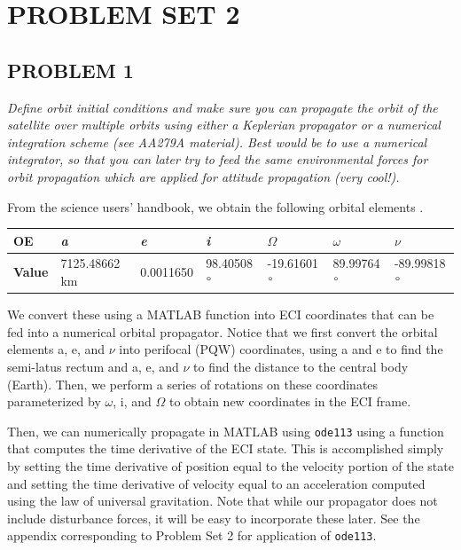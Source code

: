 \section{\Large PROBLEM SET 2}
\subsection{PROBLEM 1}
\textit{Define orbit initial conditions and make sure you can propagate the orbit of the satellite over multiple orbits using either a Keplerian propagator or a numerical integration scheme (see AA279A material). Best would be to use a numerical integrator, so that you can later try to feed the same environmental forces for orbit propagation which are applied for attitude propagation (very cool!).}

From the science users' handbook, we obtain the following orbital elements \cite{NISARHandbook}.

\begin{table}[H]
\begin{tabular}{lllllll}
\textbf{OE} & \textit{a} & \textit{e} & \textit{i} & \textit{$\Omega$} & \textit{$\omega$} & \textit{$\nu$} \\ \hline
\textbf{Value} & 7125.48662 km & 0.0011650 & 98.40508$\degree$ & -19.61601$\degree$ & 89.99764$\degree$ & -89.99818$\degree$
\end{tabular}
\end{table}

We convert these using a MATLAB function into ECI coordinates that can be fed into a numerical orbital propagator. Notice that we first convert the orbital elements a, e, and $\nu$ into perifocal (PQW) coordinates, using a and e to find the semi-latus rectum and a, e, and $\nu$ to find the distance to the central body (Earth). Then, we perform a series of rotations on these coordinates parameterized by $\omega$, i, and $\Omega$ to obtain new coordinates in the ECI frame.



Then, we can numerically propagate in MATLAB using \texttt{ode113} using a function that computes the time derivative of the ECI state. This is accomplished simply by setting the time derivative of position equal to the velocity portion of the state and setting the time derivative of velocity equal to an acceleration computed using the law of universal gravitation. Note that while our propagator does not include disturbance forces, it will be easy to incorporate these later. See the appendix corresponding to Problem Set 2 for application of \texttt{ode113}.

